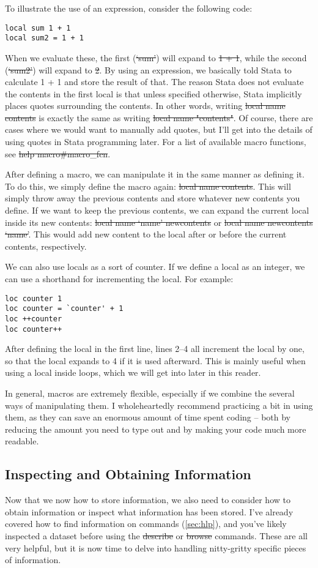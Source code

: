 To illustrate the use of an expression, consider the following code:
\begin{verbatim}
local sum 1 + 1
local sum2 = 1 + 1
\end{verbatim}
When we evaluate these, the first (\st{`sum'}) will expand to \st{1 + 1},
while the second (\st{`sum2'}) will expand to \st{2}.
By using an expression,
we basically told Stata to calculate 1 + 1 and store the result of that.
The reason Stata does not evaluate the contents in the first local is that unless specified otherwise,
Stata implicitly places quotes surrounding the contents.
In other words, writing \st{local name contents} is exactly the same as writing \st{local name "contents"}.
Of course, there are cases where we would want to manually add quotes,
but I'll get into the details of using quotes in Stata programming later.
For a list of available macro functions, see \st{help macro#macro_fcn}.

After defining a macro, we can manipulate it in the same manner as defining it.
To do this, we simply define the macro again: \st{local name contents}.
This will simply throw away the previous contents and store whatever new contents you define.
If we want to keep the previous contents,
we can expand the current local inside its new contents:
\st{local name `name' newcontents} or \st{local name newcontents `name'}.
This would add new content to the local after or before the current contents,
respectively.

We can also use locals as a sort of counter.
If we define a local as an integer,
we can use a shorthand for incrementing the local.
For example:
\begin{verbatim}
loc counter 1
loc counter = `counter' + 1
loc ++counter
loc counter++
\end{verbatim}
After defining the local in the first line,
lines 2--4 all increment the local by one,
so that the local expands to 4 if it is used afterward.
This is mainly useful when using a local inside loops,
which we will get into later in this reader.

In general, macros are extremely flexible,
especially if we combine the several ways of manipulating them.
I wholeheartedly recommend practicing a bit in using them,
as they can save an enormous amount of time spent coding --
both by reducing the amount you need to type out and by making your code much more readable.

\subsection{Inspecting and Obtaining Information}
Now that we now how to store information,
we also need to consider how to obtain information or inspect what information has been stored.
I've already covered how to find information on commands (\cref{sec:hlp}),
and you've likely inspected a dataset before using the \st{describe} or \st{browse} commands.
These are all very helpful, but it is now time to delve into handling nitty-gritty specific pieces of information.

